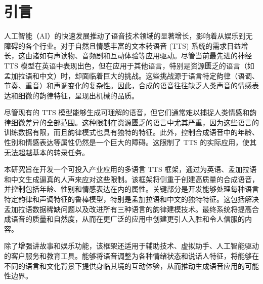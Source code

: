 \section*{引言}

人工智能（AI）的快速发展推动了语音技术领域的显著增长，影响着从娱乐到无障碍的各个行业。对于自然且情感丰富的文本转语音 (TTS) 系统的需求日益增长，这由诸如有声读物、音频剧和互动体验等应用驱动。尽管当前最先进的神经 TTS 模型在英语中表现出色，但在应用于其他语言，特别是资源匮乏的语言（如孟加拉语和中文）时，却面临着巨大的挑战。这些挑战源于语言特定韵律（语调、节奏、重音）和声调变化的复杂性。因此，合成的语音往往缺乏人类声音的情感表达和细微的韵律特征，呈现出机械的品质。\newline

尽管现有的 TTS 模型能够生成可理解的语音，但它们通常难以捕捉人类情感和韵律细微差异的全部范围。这种限制在资源匮乏的语言中尤其严重，因为这些语言的训练数据有限，而且韵律模式也具有独特的特征。此外，控制合成语音中的年龄、性别和情感表达等属性仍然是一个巨大的障碍。这限制了 TTS 的实际应用，使其无法超越基本的转录任务。\newline

本研究旨在开发一个可投入产业应用的多语言 TTS 框架，通过为英语、孟加拉语和中文生成逼真的人声来应对这些限制。该框架将侧重于创建高质量的合成语音，并控制包括年龄、性别和情感表达在内的属性。关键部分是开发能够处理每种语言特定韵律和声调特征的鲁棒模型，特别是孟加拉语和中文的独特特征。这包括解决孟加拉语数据稀缺问题以及改进所有三种语言的韵律建模技术。最终系统将提高合成语音的质量和自然度，从而在更广泛的应用中创建更引人入胜和令人信服的内容。\newline

除了增强讲故事和娱乐功能，该框架还适用于辅助技术、虚拟助手、人工智能驱动的客户服务和教育工具。能够将语音调整为各种情绪状态和说话人特征，将能够在不同的语言和文化背景下提供身临其境的互动体验，从而推动生成语音应用的可能性边界。